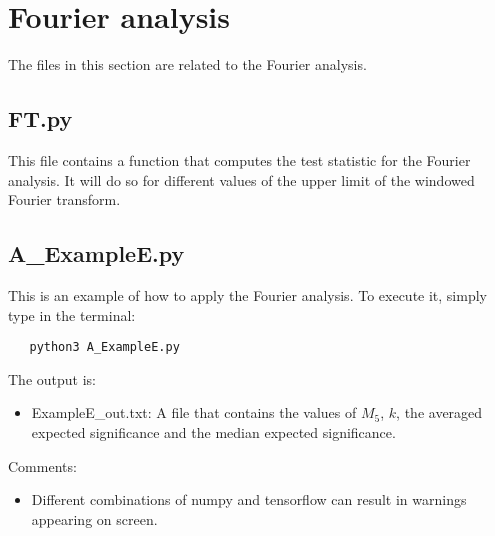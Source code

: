 \documentclass{article}
\begin{document}
\section{Fourier analysis}
The files in this section are related to the Fourier analysis.

\subsection{FT.py}
This file contains a function that computes the test statistic for the Fourier analysis. It will do so for different values of the upper limit of the windowed Fourier transform.

\subsection{A\_ExampleE.py}
This is an example of how to apply the Fourier analysis. To execute it, simply type in the terminal:
\begin{verbatim}
   python3 A_ExampleE.py
\end{verbatim}
The output is:
\begin{itemize}
  \item ExampleE\_out.txt: A file that contains the values of $M_5$, $k$, the averaged expected significance and the median expected significance.
\end{itemize}
Comments:
\begin{itemize}
  \item Different combinations of numpy and tensorflow can result in warnings appearing on screen.
\end{itemize}
\end{document}
